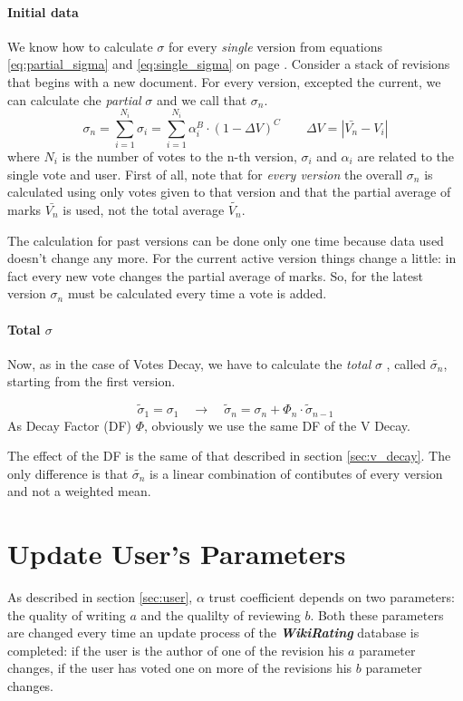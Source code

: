 \documentclass[a4paper,11pt]{article}
\newcommand{\wir}{\textbf{\textit{WikiRating }}}
\newcommand{\sg}{$\sigma$ }
\newcommand{\al}{$\alpha$ }
\begin{document}
\paragraph{Initial data} We know how to calculate \sg for every \emph{single} version from equations \ref{eq:partial_sigma} and \ref{eq:single_sigma} on page \pageref{eq:partial_sigma}. Consider a stack of revisions that begins with a new document. For every version, excepted the current, we can calculate che \emph{partial} \sg and we call that $\sigma_n$. 
\begin{equation} \label{eq:sigma_partial_n}
\sigma_{n} = \sum_{i=1}^{N_i} \sigma_i = \sum_{i=1}^{N_i} \alpha_i^B \cdot \left(1- \Delta V\right)^C \qquad \Delta V = |\bar{V_n}- V_i| 
\end{equation}
where $N_i$ is the number of votes to the n-th version,  $\sigma_i$ and $\alpha_i$ are related to the single vote and user.
First of all, note that for \textit{every version} the overall $\sigma_n$ is calculated using only votes given to that version and that the partial average of marks $\bar{V_n}$ is used, not the total average $\tilde{V_n}$. 

The calculation for past versions can be done only one time because data used doesn't change any more. For the current active version things change a little: in fact every new vote changes the partial average of marks. So, for the latest version $\sigma_n$ must be calculated every time a vote is added.

\paragraph{Total $\sigma$} Now, as in the case of Votes Decay, we have to calculate the \emph{total} \sg, called $\tilde{\sigma_n}$, starting from the first version.

\begin{equation} \label{eq:s_hat}
\tilde{\sigma}_1 = \sigma_1  \quad\longrightarrow\quad \tilde{\sigma}_n = \sigma_n + \Phi_n \cdot \tilde{\sigma}_{n-1}
\end{equation}
As Decay Factor (DF) $\Phi$, obviously we use the same DF of the V Decay.

The effect of the DF is the same of that described in section \ref{sec:v_decay}. The only difference is that $\tilde{\sigma_n}$ is a linear combination of contibutes of every version and not a weighted mean. 


\newpage
\section{Update User's Parameters} \label{sec:change_par}
As described in section \ref{sec:user}, \al trust coefficient depends on two parameters: the quality of writing $a$ and the qualilty of reviewing $b$.
Both these parameters are changed every time an update process of the \wir database is completed: if the user is the author of one of the revision his $a$ parameter changes, if the user has voted one on more of the revisions his $b$ parameter changes.
 
\end{document}
